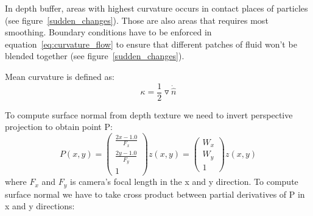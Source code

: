 In depth buffer, areas with highest curvature occurs in contact places of particles (see figure~\ref{sudden_changes}). Those are also areas that requires most smoothing. Boundary conditions have to be enforced in equation~\ref{eq:curvature_flow} to ensure that different patches of fluid won't be blended together (see figure~\ref{sudden_changes}).


Mean curvature is defined as:
\begin{equation} \label{eq:mean_curvature}
\kappa = \frac{1}{2} \triangledown \dot \hat{n}
\end{equation}

To compute surface normal from depth texture we need to invert perspective projection to obtain point P:
\begin{equation}
P(x, y) = 
\begin{pmatrix}
\frac{2x -1.0}{F_x} \\
\frac{2y -1.0}{F_y} \\
1
\end{pmatrix}
z(x,y) = 
\begin{pmatrix}
W_x \\
W_y \\
1
\end{pmatrix} z(x,y)
\end{equation}
where $F_x$ and $F_y$ is camera's focal length in the x and y direction. To compute surface normal we have to take cross product between partial derivatives of P in x and y directions:

